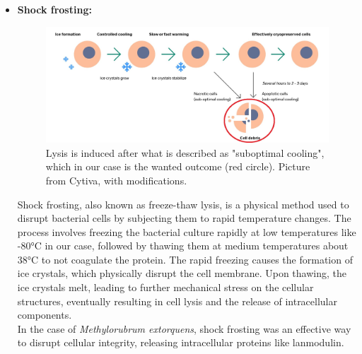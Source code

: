 \begin{itemize}
    \item \textbf{Shock frosting:} \\
    \begin{figure}[H]
                  \centering
                  \includegraphics[width=1\textwidth]{./media/images/shock_frosting_cell}
                  \caption{Lysis is induced after what is described as "suboptimal cooling", which in our case is the wanted outcome (red circle). Picture from Cytiva, with modifications.}
                  \label{fig:shock_frosting_cell}
    \end{figure}
    Shock frosting, also known as freeze-thaw lysis, is a physical method used to disrupt
    bacterial cells by subjecting them to rapid temperature changes.
    The process involves freezing the bacterial culture rapidly at low temperatures like -80°C in our case, followed by thawing them at medium temperatures about 38°C to not coagulate the protein.
    The rapid freezing causes the formation of ice crystals, which physically
    disrupt the cell membrane.
    Upon thawing, the ice crystals melt, leading to further
    mechanical stress on the cellular structures, eventually resulting in cell lysis and the release of intracellular components. \\
    In the case of \emph{Methylorubrum extorquens}, shock frosting was an effective way to
    disrupt cellular integrity, releasing intracellular proteins like lanmodulin.


\end{itemize}
